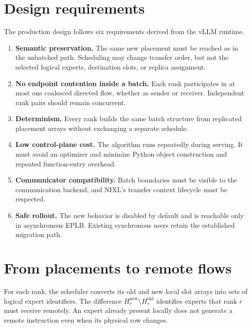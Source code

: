 \label{ch:design}

\section{Design requirements}

The production design follows six requirements derived from the vLLM runtime.

\begin{enumerate}
  \item \textbf{Semantic preservation.} The same new placement must be reached
  as in the unbatched path. Scheduling may change transfer order, but not the
  selected logical experts, destination slots, or replica assignment.

  \item \textbf{No endpoint contention inside a batch.} Each rank participates
  in at most one coalesced directed flow, whether as sender or receiver.
  Independent rank pairs should remain concurrent.

  \item \textbf{Determinism.} Every rank builds the same batch structure from
  replicated placement arrays without exchanging a separate schedule.

  \item \textbf{Low control-plane cost.} The algorithm runs repeatedly during
  serving. It must avoid an optimizer and minimize Python object construction
  and repeated function-entry overhead.

  \item \textbf{Communicator compatibility.} Batch boundaries must be visible
  to the communication backend, and NIXL's transfer context lifecycle must be
  respected.

  \item \textbf{Safe rollout.} The new behavior is disabled by default and is
  reachable only in asynchronous EPLB. Existing synchronous users retain the
  established migration path.
\end{enumerate}

\section{From placements to remote flows}

For each rank, the scheduler converts its old and new local slot arrays into
sets of logical expert identifiers. The difference
$H^{\mathrm{new}}_r\setminus H^{\mathrm{old}}_r$ identifies experts that rank
$r$ must receive remotely. An expert already present locally does not generate
a remote instruction even when its physical row changes.

